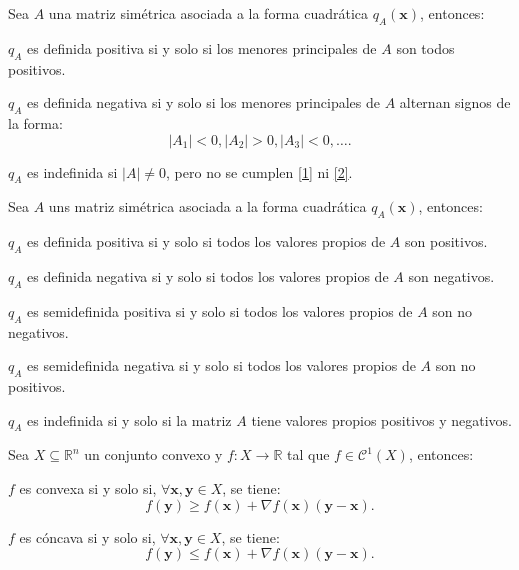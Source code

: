 \documentclass[8pt,a4paper]{extarticle}
\begin{document}
\begin{multicols}{3}
\newpage

\begin{boxtheo}
	Sea $A$ una matriz simétrica asociada a la forma cuadrática $q_A(\mathbf{x})$, entonces:
	\begin{eqlist}
	\item\label{1}$q_A$ es definida positiva si y solo si los menores principales de $A$ son todos positivos.
	\item\label{2} $q_A$ es definida negativa si y solo si los menores principales de $A$ alternan signos de la forma:
		\[
		 \left| A_1 \right| < 0, \left| A_2 \right| > 0, \left| A_3 \right| < 0, \ldots
		.\] 
	\item $q_A$ es indefinida si $\left| A \right| \neq 0$, pero no se cumplen \ref{1} ni \ref{2}.
	\end{eqlist}
\end{boxtheo}

\begin{boxtheo}
	Sea $A$ uns matriz simétrica asociada a la forma cuadrática $q_A(\mathbf{x})$, entonces:
	\begin{eqlist}
	\item $q_A$ es definida positiva si y solo si todos los valores propios de $A$ son positivos.
	\item $q_A$ es definida negativa si y solo si todos los valores propios de $A$ son negativos.
	\item $q_A$ es semidefinida positiva si y solo si todos los valores propios de $A$ son no negativos.
	\item $q_A$ es semidefinida negativa si y solo si todos los valores propios de $A$ son no positivos.
	\item $q_A$ es indefinida si y solo si la matriz $A$ tiene valores propios positivos y negativos.
	\end{eqlist}
\end{boxtheo}

\begin{boxtheo}
	Sea $X \subseteq \mathbb{R}^n$ un conjunto convexo y $f : X \to \mathbb{R}$ tal que $f \in \mathcal{C}^1(X)$, entonces:
	\begin{eqlist}
	\item $f$ es convexa si y solo si, $\forall \mathbf{x}, \mathbf{y} \in X$, se tiene:
		\[
			f(\mathbf{y}) \ge f(\mathbf{x}) + \nabla f(\mathbf{x})(\mathbf{y} - \mathbf{x})
		.\]
	\item $f$ es cóncava si y solo si, $\forall \mathbf{x}, \mathbf{y} \in X$, se tiene:
		\[
			f(\mathbf{y}) \le f(\mathbf{x}) + \nabla f(\mathbf{x})(\mathbf{y} - \mathbf{x})
		.\] 
	\end{eqlist}
\end{boxtheo}


\end{multicols}
\end{document}
